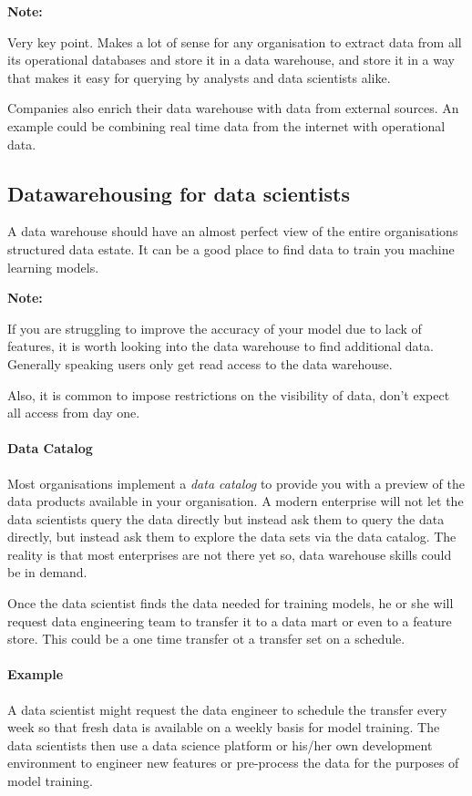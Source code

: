 \documentclass[a4paper, 11pt]{book}
\newenvironment{note}{
    \begin{siderule}
        \textbf{Note: }
        }{
    \end{siderule}}
\begin{document}
    \begin{note}
        Very key point.
        Makes a lot of sense for any organisation to extract data from all its operational databases and store it in a data warehouse,
        and store it in a way that makes it easy for querying by analysts and data scientists alike.
    \end{note}

    Companies also enrich their data warehouse with data from external sources.
    An example could be combining real time data from the internet with operational data.

    \subsection{Datawarehousing for data scientists}

    A data warehouse should have an almost perfect view of the entire organisations structured data estate.
    It can be a good place to find data to train you machine learning models.
    \begin{note}
        If you are struggling to improve the accuracy of your model due to lack of features, it is worth looking into the data warehouse to find additional data.
        Generally speaking users only get read access to the data warehouse.
    \end{note}
    Also, it is common to impose restrictions on the visibility of data, don't expect all access from day one.

    \paragraph{Data Catalog}
    Most organisations implement a \textit{data catalog} to provide you with a preview of the data products available in your organisation.
    A modern enterprise will not let the data scientists query the data directly but instead ask them to query the data directly, but instead ask them to explore the data sets via the data catalog.
    The reality is that most enterprises are not there yet so, data warehouse skills could be in demand.

    Once the data scientist finds the data needed for training models, he or she will request data engineering team to transfer it to a data mart or even to a feature store.
    This could be a one time transfer ot a transfer set on a schedule.

    \paragraph{Example}
    A data scientist might request the data engineer to schedule the transfer every week so that fresh data is available on a weekly basis for model training.
    The data scientists then use a data science platform or his/her own development environment to engineer new features or pre-process the data for the purposes of model training.
\end{document}
